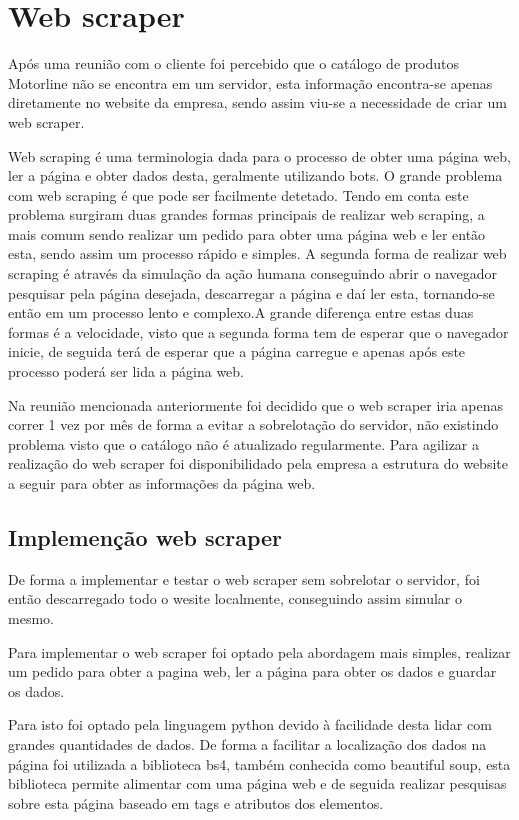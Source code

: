 

\section{Web scraper}

Após uma reunião com o cliente foi percebido que o catálogo de produtos Motorline não se encontra em um
servidor, esta informação encontra-se apenas diretamente no website da empresa, sendo assim viu-se a 
necessidade de criar um web scraper.

Web scraping é uma terminologia dada para o processo de obter uma página web, ler a página e obter
dados desta, geralmente utilizando bots. O grande problema com web scraping é que pode ser facilmente
detetado. Tendo em conta este problema surgiram duas grandes formas principais de realizar web scraping,
a mais comum sendo realizar um pedido para obter uma página web e ler então esta, sendo assim um processo
rápido e simples. A segunda forma de realizar web scraping é através da simulação da ação humana 
conseguindo abrir o navegador pesquisar pela página desejada, descarregar a página e daí ler esta, 
tornando-se então em um processo lento e complexo.A grande diferença entre estas duas formas é a 
velocidade, visto que a segunda forma tem de esperar que o navegador inicie, de seguida terá de 
esperar que a página carregue e apenas após este processo poderá ser lida a página web.

Na reunião mencionada anteriormente foi decidido que o web scraper iria apenas correr 1 vez por mês
de forma a evitar a sobrelotação do servidor, não existindo problema visto que o catálogo não é 
atualizado regularmente. Para agilizar a realização do web scraper foi disponibilidado pela 
empresa a estrutura do website a seguir para obter as informações da página web.

\newpage

\subsection{Implemenção web scraper}
De forma a implementar e testar o web scraper sem sobrelotar o servidor, foi então descarregado todo
o wesite localmente, conseguindo assim simular o mesmo.

Para implementar o web scraper foi optado pela abordagem mais simples, realizar um pedido para obter a
pagina web, ler a página para obter os dados e guardar os dados.

Para isto foi optado pela linguagem python devido à facilidade desta lidar com grandes quantidades 
de dados. De forma a facilitar a localização dos dados na página foi utilizada a biblioteca bs4, também
conhecida como beautiful soup, esta biblioteca permite alimentar com uma página web e de seguida realizar
pesquisas sobre esta página baseado em tags e atributos dos elementos.

